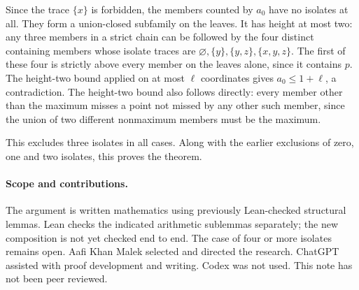 \documentclass[11pt,letterpaper]{article}
\begin{document}
Since the trace \(\{x\}\) is forbidden, the members counted by
\(a_0\) have no isolates at all. They form a union-closed subfamily
on the leaves. It has height at most two: any three members in
a strict chain can be followed by the four distinct containing
members whose isolate traces are
\(\varnothing,\{y\},\{y,z\},\{x,y,z\}\). The first of these four
is strictly above every member on the leaves alone, since it
contains \(p\). The height-two bound applied on at most
\(\ell\) coordinates gives \(a_0\le1+\ell\), a contradiction.
The height-two bound also follows directly: every member other
than the maximum misses a point not missed by any other such
member, since the union of two different nonmaximum members
must be the maximum.

This excludes three isolates in all cases. Along with the earlier
exclusions of zero, one and two isolates, this proves the theorem.

\paragraph{Scope and contributions.}
The argument is written mathematics using previously Lean-checked
structural lemmas. Lean checks the indicated arithmetic sublemmas separately; the new composition is not yet checked end to end. The case of four or more isolates remains open.
Aafi Khan Malek selected and directed the research. ChatGPT assisted
with proof development and writing. Codex was not used.
This note has not been peer reviewed.
\end{document}
